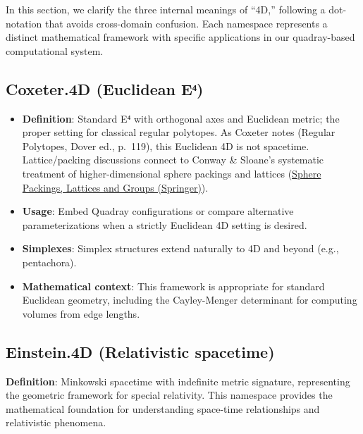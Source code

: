 \documentclass[
  10pt,
]{article}
\providecommand{\tightlist}{%
  \setlength{\itemsep}{0pt}\setlength{\parskip}{0pt}}
\begin{document}
In this section, we clarify the three internal meanings of ``4D,''
following a dot-notation that avoids cross-domain confusion. Each
namespace represents a distinct mathematical framework with specific
applications in our quadray-based computational system.

\hypertarget{coxeter.4d-euclidean-eux2074}{%
\subsection{Coxeter.4D (Euclidean
E⁴)}\label{coxeter.4d-euclidean-eux2074}}

\begin{itemize}
\tightlist
\item
  \textbf{Definition}: Standard E⁴ with orthogonal axes and Euclidean
  metric; the proper setting for classical regular polytopes. As Coxeter
  notes (Regular Polytopes, Dover ed., p.~119), this Euclidean 4D is not
  spacetime. Lattice/packing discussions connect to Conway \& Sloane's
  systematic treatment of higher-dimensional sphere packings and
  lattices
  (\href{https://link.springer.com/book/10.1007/978-1-4757-6568-7}{Sphere
  Packings, Lattices and Groups (Springer)}).
\item
  \textbf{Usage}: Embed Quadray configurations or compare alternative
  parameterizations when a strictly Euclidean 4D setting is desired.
\item
  \textbf{Simplexes}: Simplex structures extend naturally to 4D and
  beyond (e.g., pentachora).
\item
  \textbf{Mathematical context}: This framework is appropriate for
  standard Euclidean geometry, including the Cayley-Menger determinant
  for computing volumes from edge lengths.
\end{itemize}

\hypertarget{einstein.4d-relativistic-spacetime}{%
\subsection{Einstein.4D (Relativistic
spacetime)}\label{einstein.4d-relativistic-spacetime}}

\textbf{Definition}: Minkowski spacetime with indefinite metric
signature, representing the geometric framework for special relativity.
This namespace provides the mathematical foundation for understanding
space-time relationships and relativistic phenomena.
\end{document}
